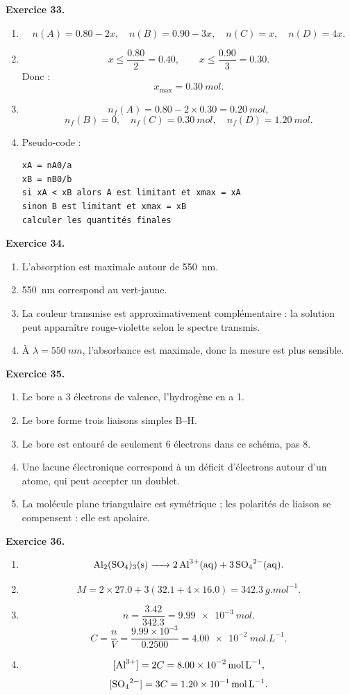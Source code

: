 \documentclass[11pt,a4paper]{article}
\newcommand{\corr}[2]{
  \begin{correctionbox}
  \textbf{Exercice #1.} #2
  \end{correctionbox}
}
\begin{document}
\corr{33}{
\begin{enumerate}
  \item
  \[
  n(A)=0.80-2x,\quad n(B)=0.90-3x,\quad n(C)=x,\quad n(D)=4x.
  \]
  \item
  \[
  x\leq \frac{0.80}{2}=0.40,\qquad x\leq \frac{0.90}{3}=0.30.
  \]
  Donc :
  \[
  x_{\max}=\SI{0.30}{mol}.
  \]
  \item
  \[
  n_f(A)=0.80-2\times 0.30=\SI{0.20}{mol},
  \]
  \[
  n_f(B)=0,\quad n_f(C)=\SI{0.30}{mol},\quad n_f(D)=\SI{1.20}{mol}.
  \]
  \item Pseudo-code :
\begin{verbatim}
xA = nA0/a
xB = nB0/b
si xA < xB alors A est limitant et xmax = xA
sinon B est limitant et xmax = xB
calculer les quantités finales
\end{verbatim}
\end{enumerate}
}

\corr{34}{
\begin{enumerate}
  \item L'absorption est maximale autour de \SI{550}{nm}.
  \item \SI{550}{nm} correspond au vert-jaune.
  \item La couleur transmise est approximativement complémentaire : la solution peut apparaître rouge-violette selon le spectre transmis.
  \item À $\lambda=\SI{550}{nm}$, l'absorbance est maximale, donc la mesure est plus sensible.
\end{enumerate}
}

\corr{35}{
\begin{enumerate}
  \item Le bore a 3 électrons de valence, l'hydrogène en a 1.
  \item Le bore forme trois liaisons simples B--H.
  \item Le bore est entouré de seulement 6 électrons dans ce schéma, pas 8.
  \item Une lacune électronique correspond à un déficit d'électrons autour d'un atome, qui peut accepter un doublet.
  \item La molécule plane triangulaire est symétrique ; les polarités de liaison se compensent : elle est apolaire.
\end{enumerate}
}

\corr{36}{
\begin{enumerate}
  \item
  \[
  \ce{Al2(SO4)3(s) -> 2Al^{3+}(aq) + 3SO4^{2-}(aq)}.
  \]
  \item
  \[
  M=2\times 27.0+3(32.1+4\times 16.0)=\SI{342.3}{g.mol^{-1}}.
  \]
  \item
  \[
  n=\frac{3.42}{342.3}=\SI{9.99e-3}{mol}.
  \]
  \[
  C=\frac{n}{V}=\frac{9.99\times 10^{-3}}{0.2500}=\SI{4.00e-2}{mol.L^{-1}}.
  \]
  \item
  \[
  [\ce{Al^{3+}}]=2C=\SI{8.00e-2}{mol.L^{-1}},
  \]
  \[
  [\ce{SO4^{2-}}]=3C=\SI{1.20e-1}{mol.L^{-1}}.
  \]
\end{enumerate}
}
\end{document}
